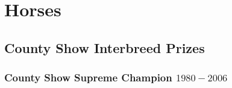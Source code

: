 \chapter{Horses}
\section[Interbreed]{County Show Interbreed Prizes}
\subsection[Supreme Champion]{County Show Supreme Champion $1980 - 2006$}
\small

\normalsize


